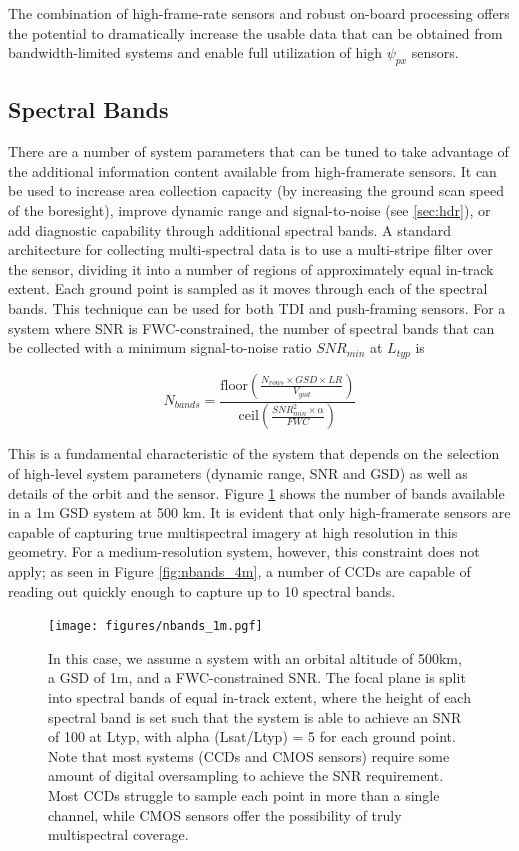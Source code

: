 \documentclass[]{spieman}  %
\begin{document}
The combination of high-frame-rate sensors and robust on-board processing offers the potential to dramatically increase the usable data that can be obtained from bandwidth-limited systems and enable full utilization of high $\psi_{px}$ sensors.

\subsection{Spectral Bands}
\label{sec:spec}

There are a number of system parameters that can be tuned to take advantage of the additional information content available from high-framerate sensors. It can be used to increase area collection capacity (by increasing the ground scan speed of the boresight), improve dynamic range and signal-to-noise (see \ref{sec:hdr}), or add diagnostic capability through additional spectral bands. A standard architecture for collecting multi-spectral data is to use a multi-stripe filter over the sensor, dividing it into a number of regions of approximately equal in-track extent. Each ground point is sampled as it moves through each of the spectral bands. This technique can be used for both TDI and push-framing sensors. For a system where SNR is FWC-constrained, the number of spectral bands that can be collected with a minimum signal-to-noise ratio $SNR_{min}$ at $L_{typ}$ is

\begin{equation}
    \label{eq:nbands}
    N_{bands} = \frac{\text{floor}\left(\frac{N_{rows}\times GSD\times LR}{V_{gnd}}\right)} {\text{ceil}\left(\frac{SNR_{min}^{2}\times\alpha}{FWC}\right)}
\end{equation}

This is a fundamental characteristic of the system that depends on the selection of high-level system parameters (dynamic range, SNR and GSD) as well as details of the orbit and the sensor. Figure \ref{fig:nbands_1m} shows the number of bands available in a 1m GSD system at 500 km. It is evident that only high-framerate sensors are capable of capturing true multispectral imagery at high resolution in this geometry. For a medium-resolution system, however, this constraint does not apply; as seen in Figure \ref{fig:nbands_4m}, a number of CCDs are capable of reading out quickly enough to capture up to 10 spectral bands.

\begin{figure}
  \centering
  \texttt{[image: figures/nbands\_1m.pgf]}
  \caption{In this case, we assume a system with an orbital altitude of 500km, a GSD of 1m, and a FWC-constrained SNR. The focal plane is split into spectral bands of equal in-track extent, where the height of each spectral band is set such that the system is able to achieve an SNR of 100 at Ltyp, with alpha (Lsat/Ltyp) = 5 for each ground point. Note that most systems (CCDs and CMOS sensors) require some amount of digital oversampling to achieve the SNR requirement. Most CCDs struggle to sample each point in more than a single channel, while CMOS sensors offer the possibility of truly multispectral coverage. \label{fig:nbands_1m}}
\end{figure}
\end{document}
